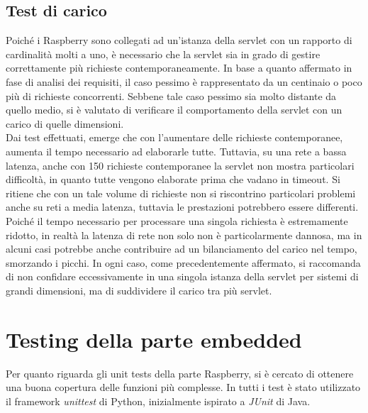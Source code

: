 \subsection{Test di carico}
Poiché i Raspberry sono collegati ad un'istanza della servlet con un rapporto di cardinalità molti a uno, è necessario che la servlet sia in grado di gestire correttamente più richieste contemporaneamente.
In base a quanto affermato in fase di analisi dei requisiti, il caso pessimo è rappresentato da un centinaio o poco più di richieste concorrenti.
Sebbene tale caso pessimo sia molto distante da quello medio, si è valutato di verificare il comportamento della servlet con un carico di quelle dimensioni.
\\Dai test effettuati, emerge che con l'aumentare delle richieste contemporanee, aumenta il tempo necessario ad elaborarle tutte.
Tuttavia, su una rete a bassa latenza, anche con 150 richieste contemporanee la servlet non mostra particolari difficoltà, in quanto tutte vengono elaborate prima che vadano in timeout.
Si ritiene che con un tale volume di richieste non si riscontrino particolari problemi anche su reti a media latenza, tuttavia le prestazioni potrebbero essere differenti.
Poiché il tempo necessario per processare una singola richiesta è estremamente ridotto, in realtà la latenza di rete non solo non è particolarmente dannosa, ma in alcuni casi potrebbe anche contribuire ad un bilanciamento del carico nel tempo, smorzando i picchi.
In ogni caso, come precedentemente affermato, si raccomanda di non confidare eccessivamente in una singola istanza della servlet per sistemi di grandi dimensioni, ma di suddividere il carico tra più servlet.


\section{Testing della parte embedded}
Per quanto riguarda gli unit tests della parte Raspberry, si è cercato di ottenere una buona copertura delle funzioni più complesse.
In tutti i test è stato utilizzato il framework \textit{unittest} di Python, inizialmente ispirato a \textit{JUnit} di Java.

